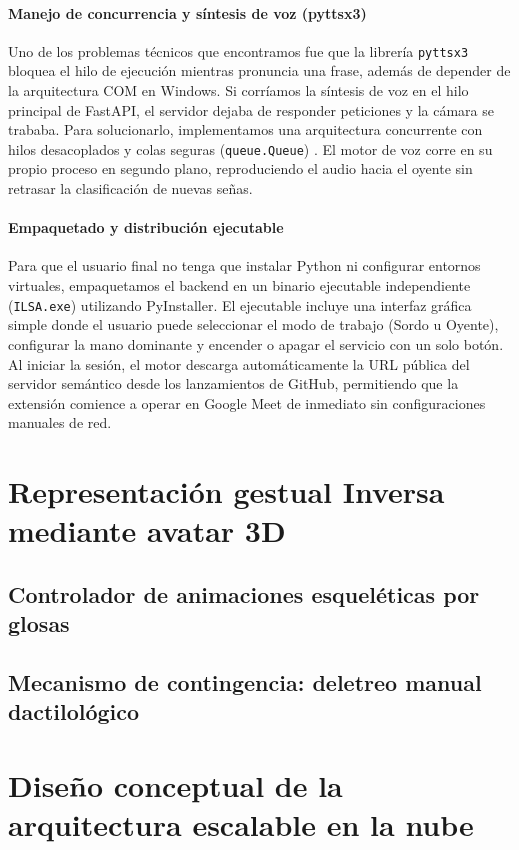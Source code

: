 \paragraph{Manejo de concurrencia y síntesis de voz (pyttsx3)}
Uno de los problemas técnicos que encontramos fue que la librería \texttt{pyttsx3} bloquea el hilo de ejecución mientras pronuncia una frase, además de depender de la arquitectura COM en Windows. Si corríamos la síntesis de voz en el hilo principal de FastAPI, el servidor dejaba de responder peticiones y la cámara se trababa. Para solucionarlo, implementamos una arquitectura concurrente con hilos desacoplados y colas seguras (\texttt{queue.Queue}) \parencite{pressman2014software}. El motor de voz corre en su propio proceso en segundo plano, reproduciendo el audio hacia el oyente sin retrasar la clasificación de nuevas señas.

\paragraph{Empaquetado y distribución ejecutable}
Para que el usuario final no tenga que instalar Python ni configurar entornos virtuales, empaquetamos el backend en un binario ejecutable independiente (\texttt{ILSA.exe}) utilizando PyInstaller. El ejecutable incluye una interfaz gráfica simple donde el usuario puede seleccionar el modo de trabajo (Sordo u Oyente), configurar la mano dominante y encender o apagar el servicio con un solo botón. Al iniciar la sesión, el motor descarga automáticamente la URL pública del servidor semántico desde los lanzamientos de GitHub, permitiendo que la extensión comience a operar en Google Meet de inmediato sin configuraciones manuales de red.
\section{Representación gestual Inversa mediante avatar 3D}
\subsection{Controlador de animaciones esqueléticas por glosas}
\subsection{Mecanismo de contingencia: deletreo manual dactilológico}

\section{Diseño conceptual de la arquitectura escalable en la nube}

